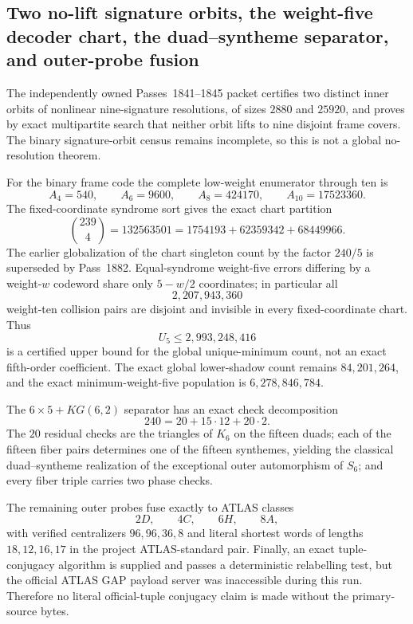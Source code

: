 \subsection{Two no-lift signature orbits, the weight-five decoder chart, the duad--syntheme separator, and outer-probe fusion}
\label{subsec:bt1850-five-frontiers}
The independently owned Passes~1841--1845 packet certifies two distinct inner orbits of nonlinear nine-signature resolutions, of sizes $2880$ and $25920$, and proves by exact multipartite search that neither orbit lifts to nine disjoint frame covers.  The binary signature-orbit census remains incomplete, so this is not a global no-resolution theorem.

For the binary frame code the complete low-weight enumerator through ten is
\[
 A_4=540,\qquad A_6=9600,\qquad A_8=424170,\qquad A_{10}=17523360.
\]
The fixed-coordinate syndrome sort gives the exact chart partition
\[
 \binom{239}{4}=132563501
 =1754193+62359342+68449966.
\]
The earlier globalization of the chart singleton count by the factor $240/5$ is superseded by Pass~1882.  Equal-syndrome weight-five errors differing by a weight-$w$ codeword share only $5-w/2$ coordinates; in particular all
\[
 2{,}207{,}943{,}360
\]
weight-ten collision pairs are disjoint and invisible in every fixed-coordinate chart.  Thus
\[
 \boxed{U_5\le 2{,}993{,}248{,}416}
\]
is a certified upper bound for the global unique-minimum count, not an exact fifth-order coefficient.  The exact global lower-shadow count remains $84{,}201{,}264$, and the exact minimum-weight-five population is $6{,}278{,}846{,}784$.

The $6\times5+KG(6,2)$ separator has an exact check decomposition
\[
 \boxed{240=20+15\cdot12+20\cdot2}.
\]
The $20$ residual checks are the triangles of $K_6$ on the fifteen duads; each of the fifteen fiber pairs determines one of the fifteen synthemes, yielding the classical duad--syntheme realization of the exceptional outer automorphism of $S_6$; and every fiber triple carries two phase checks.

The remaining outer probes fuse exactly to ATLAS classes
\[
 2D,\qquad4C,\qquad6H,\qquad8A,
\]
with verified centralizers $96,96,36,8$ and literal shortest words of lengths $18,12,16,17$ in the project ATLAS-standard pair.  Finally, an exact tuple-conjugacy algorithm is supplied and passes a deterministic relabelling test, but the official ATLAS GAP payload server was inaccessible during this run.  Therefore no literal official-tuple conjugacy claim is made without the primary-source bytes.
